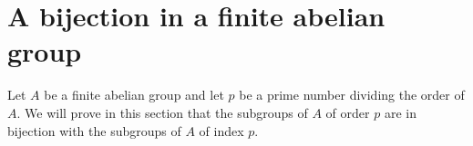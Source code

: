 \section{A bijection in a finite abelian group}

Let $A$ be a finite abelian group and let $p$ be a prime number dividing the order of $A$.
We will prove in this section that the subgroups of $A$ of order $p$ are in bijection with the subgroups of $A$ of index $p$.